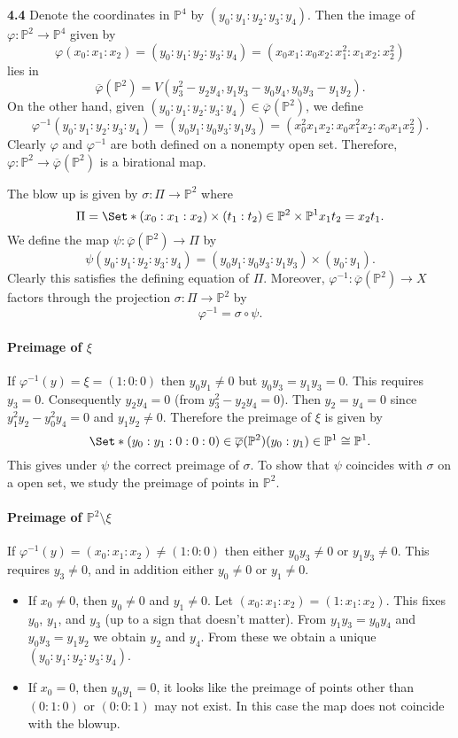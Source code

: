 \documentclass{article}
\makeatletter
\newcommand*{\shifttext}[1]{%
  \settowidth{\@tempdima}{#1}%
  \hspace{-\@tempdima}#1%
}
\newcommand{\plabel}[1]{%
\shifttext{\textbf{#1}\quad}%
}
\makeatother
\begin{document}
\plabel{4.4}%
Denote the coordinates in $\mathbb{P}^4$ by $(y_0:y_1:y_2:y_3:y_4)$.
Then the image of $\varphi\colon\mathbb{P}^2\to\mathbb{P}^4$ given by
\[ \varphi(x_0:x_1:x_2) = (y_0:y_1:y_2:y_3:y_4) = (x_0x_1:x_0x_2:x_1^2:x_1x_2:x_2^2) \]
lies in
\[ \overline{\varphi}(\mathbb{P}^2) = V(y_3^2 - y_2 y_4, y_1y_3 - y_0 y_4, y_0 y_3 - y_1 y_2). \] %
On the other hand, given $(y_0:y_1:y_2:y_3:y_4)\in \overline{\varphi}(\mathbb{P}^2)$, we define
\[ \varphi^{-1}(y_0:y_1:y_2:y_3:y_4) = (y_0 y_1: y_0 y_3: y_1 y_3) = (x_0^2 x_1 x_2: x_0 x_1^2 x_2: x_0 x_1 x_2^2). \]
Clearly $\varphi$ and $\varphi^{-1}$ are both defined on a nonempty open set.
Therefore, $\varphi\colon \mathbb{P}^2 \to \overline{\varphi}(\mathbb{P}^2)$ is a birational map.
\par
The blow up is given by $\sigma\colon\Pi\to \mathbb{P}^2$ where
\[ \Pi = \Set*{(x_0:x_1:x_2)\times (t_1:t_2) \in \mathbb{P}^2 \times \mathbb{P}^1}{x_1 t_2 = x_2 t_1}. \]
We define the map $\psi\colon \overline{\varphi}(\mathbb{P}^2) \to \Pi$ by
\[ \psi(y_0:y_1:y_2:y_3:y_4) = (y_0 y_1: y_0 y_3: y_1 y_3) \times (y_0:y_1). \]
Clearly this satisfies the defining equation of $\Pi$.
Moreover, $\varphi^{-1}\colon \overline{\varphi}(\mathbb{P}^2) \to X$ factors through the projection $\sigma\colon \Pi \to \mathbb{P}^2$ by
\[ \varphi^{-1} = \sigma \circ \psi. \]

\paragraph*{Preimage of $\xi$}
If $\varphi^{-1}(y) = \xi = (1:0:0)$ then $y_0 y_1\neq 0$ but $y_0 y_3 = y_1 y_3 = 0$.
This requires $y_3 = 0$.
Consequently $y_2 y_4 = 0$ (from $y_3^2 - y_2 y_4 = 0$).
Then $y_2 = y_4 = 0$ since $y_1^2 y_2 - y_0^2 y_4 = 0$ and $y_1 y_2 \neq 0$.
Therefore the preimage of $\xi$ is given by
\[ \Set*{(y_0:y_1:0:0:0) \in \overline{\varphi}(\mathbb{P}^2)}{(y_0:y_1)\in \mathbb{P}^1} \cong \mathbb{P}^1. \]
This gives under $\psi$ the correct preimage of $\sigma$.
To show that $\psi$ coincides with $\sigma$ on a open set, we study the preimage of points in $\mathbb{P}^2$.

\paragraph*{Preimage of $\mathbb{P}^2 \setminus \xi$}
If $\varphi^{-1}(y) = (x_0:x_1:x_2) \neq (1:0:0)$ then either $y_0 y_3 \neq 0$ or $y_1 y_3 \neq 0$.
This requires $y_3 \neq 0$, and in addition either $y_0\neq 0$ or $y_1 \neq 0$.
\begin{itemize}
    \item 
    If $x_0 \neq 0$, then $y_0 \neq 0$ and $y_1 \neq 0$.
    Let $(x_0:x_1:x_2) = (1:x_1:x_2)$.
    This fixes $y_0$, $y_1$, and $y_3$ (up to a sign that doesn't matter).
    From $y_1 y_3 = y_0 y_4$ and $y_0 y_3 = y_1 y_2$ we obtain $y_2$ and $y_4$.
    From these we obtain a unique $(y_0:y_1:y_2:y_3:y_4)$.
    \item
    If $x_0 = 0$, then $y_0 y_1 = 0$, it looks like the preimage of points other than $(0:1:0)$ or $(0:0:1)$ may not exist.
    In this case the map does not coincide with the blowup.
\end{itemize}
\end{document}
